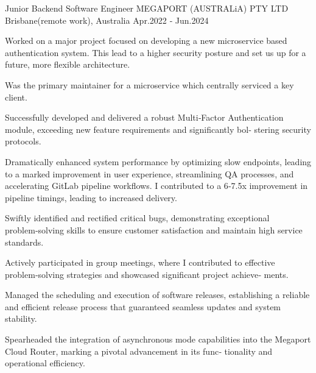 \begin{cventries}
  \cventry
    {Junior Backend Software Engineer } %
    {MEGAPORT (AUSTRALiA) PTY LTD} %
    {Brisbane(remote work), Australia} %
    {Apr.2022 ‑ Jun.2024} %
    {
      \begin{cvitems} %
        \item {Worked on a major project focused on developing a new microservice based authentication system. This lead to a higher security posture and
        set us up for a future, more flexible architecture.}
        \item {Was the primary maintainer for a microservice which centrally serviced a key client.}
        \item {Successfully developed and delivered a robust Multi‑Factor Authentication module, exceeding new feature requirements and significantly bol‑
        stering security protocols.}
        \item {Dramatically enhanced system performance by optimizing slow endpoints, leading to a marked improvement in user experience, streamlining
        QA processes, and accelerating GitLab pipeline workflows. I contributed to a 6‑7.5x improvement in pipeline timings, leading to increased
        delivery.}
        \item {Swiftly identified and rectified critical bugs, demonstrating exceptional problem‑solving skills to ensure customer satisfaction and maintain high
        service standards.}
        \item {Actively participated in group meetings, where I contributed to effective problem‑solving strategies and showcased significant project achieve‑
        ments.}
        \item {Managed the scheduling and execution of software releases, establishing a reliable and efficient release process that guaranteed seamless
        updates and system stability.}
        \item {Spearheaded the integration of asynchronous mode capabilities into the Megaport Cloud Router, marking a pivotal advancement in its func‑
        tionality and operational efficiency.}
      \end{cvitems}
    }


\end{cventries}
